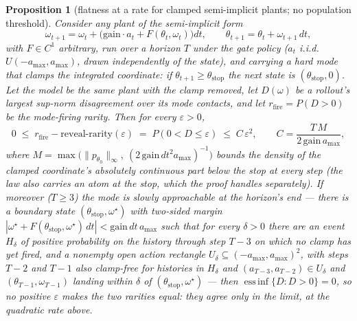 \documentclass[11pt]{article}
\newtheorem{proposition}{Proposition}
\theoremstyle{definition}
\theoremstyle{remark}
\begin{document}
\begin{proposition}[flatness at a rate for clamped semi-implicit plants; no population threshold]
\label{prop:epsrate}
Consider any plant of the semi-implicit form
\[
  \omega_{t+1} = \omega_t + \bigl(\mathrm{gain}\cdot a_t + F(\theta_t, \omega_t)\bigr)dt,
  \qquad \theta_{t+1} = \theta_t + \omega_{t+1}\,dt,
\]
with $F \in C^1$ \emph{arbitrary}, run over a horizon $T$ under the gate policy ($a_t$ i.i.d.\ $U(-a_{\max}, a_{\max})$, drawn independently of the state), and carrying a hard mode that clamps the integrated coordinate: if $\theta_{t+1} \geq \theta_{\mathrm{stop}}$ the next state is $(\theta_{\mathrm{stop}}, 0)$. Let the model be the same plant with the clamp removed, let $D(\omega)$ be a rollout's largest sup-norm disagreement over its mode contacts, and let $r_{\mathrm{fire}} = P(D > 0)$ be the mode-firing rarity. Then for every $\varepsilon > 0$,
\[
  0 \;\leq\; r_{\mathrm{fire}} - \mathrm{reveal\text{-}rarity}(\varepsilon) \;=\; P(0 < D \leq \varepsilon) \;\leq\; C\,\varepsilon^2,
  \qquad C = \frac{T\,M}{2\,\mathrm{gain}\,a_{\max}},
\]
where $M = \max\bigl(\|p_{\theta_0}\|_\infty,\ (2\,\mathrm{gain}\,dt^2 a_{\max})^{-1}\bigr)$ bounds the density of the clamped coordinate's absolutely continuous part below the stop at every step (the law also carries an atom \emph{at} the stop, which the proof handles separately). If moreover ($T \geq 3$) the mode is \emph{slowly approachable at the horizon's end} --- there is a boundary state $(\theta_{\mathrm{stop}}, \omega^\star)$ with two-sided margin $|\omega^\star + F(\theta_{\mathrm{stop}},\omega^\star)\,dt| < \mathrm{gain}\,dt\,a_{\max}$ such that for every $\delta > 0$ there are an event $H_\delta$ of positive probability on the history through step $T-3$ on which \emph{no clamp has yet fired}, and a nonempty open action rectangle $U_\delta \subseteq (-a_{\max}, a_{\max})^2$, with steps $T-2$ and $T-1$ also clamp-free for histories in $H_\delta$ and $(a_{T-3}, a_{T-2}) \in U_\delta$ and $(\theta_{T-1}, \omega_{T-1})$ landing within $\delta$ of $(\theta_{\mathrm{stop}}, \omega^\star)$ --- then $\operatorname*{ess\,inf}\{D : D > 0\} = 0$, so no positive $\varepsilon$ makes the two rarities equal: they agree only in the limit, at the quadratic rate above.
\end{proposition}
\end{document}
